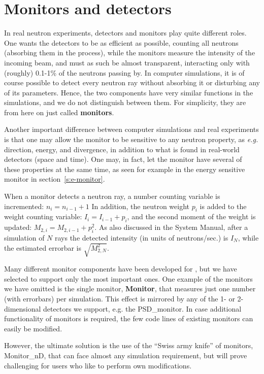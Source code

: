 
\chapter{Monitors and detectors}

In real neutron experiments, detectors and monitors play quite
different roles. One wants the detectors to be as efficient as
possible, counting all neutrons (absorbing them in the process),
while the monitors measure the intensity of the incoming beam, and must
as such be almost transparent, interacting only with (roughly) 0.1-1\%
of the neutrons passing by. In computer simulations, it is
of course possible to detect every neutron ray without
absorbing it or disturbing any of its parameters. Hence, the two components
have very similar functions in the simulations, and we do
not distinguish between them. For simplicity, they are from here on
just called {\bf monitors}.

Another important difference between computer simulations
and real experiments is
that one may allow the monitor to be sensitive to any neutron property,
as {\em e.g.} direction, energy, and divergence, in addition to what
is found in real-world detectors (space and time). One may, in
fact, let the monitor have several of these properties at the same time,
as seen for example in the energy sensitive monitor in
section~\ref{s:e-monitor}.

When a monitor detects a neutron ray,
a number counting variable is incremented: $n_i = n_{i-1}+1$
In addition, the neutron
weight $p_i$ is added to the weight counting variable:
$I_i = I_{i-1} + p_i$,
and the second moment of the weight is
updated: $M_{2,i} = M_{2,i-1} + p_i^2$.
As also discussed in the System Manual, after a simulation of $N$ rays
the detected intensity (in units of neutrons/sec.) is $I_N$,
while the estimated errorbar is $\sqrt{M_{2,N}^2}$.

Many different monitor components have been developed for
\MCS , but we have selected to support only the most important ones.
One example of the monitors we have omitted is the single monitor,
{\bf Monitor},
that measures just one number (with errorbars) per simulation.
This effect is mirrored by any of the 1- or 2-dimensional detectors
we support, e.g. the {\rm PSD\_monitor}.
In case additional functionality of monitors is required,
the few code lines of existing monitors can easily be modified.

However, the ultimate solution is the use of the
``Swiss army knife'' of monitors, {\rm Monitor\_nD}, that can face
almost any simulation requirement, 
but will prove challenging for users who like to perform own modifications.

\newpage


\newpage


\newpage


\newpage


\newpage


\newpage


\newpage

